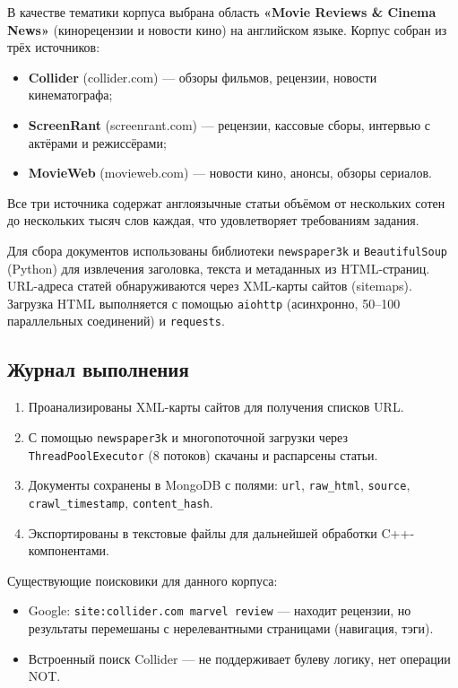 \documentclass[a4paper,12pt]{article}
\begin{document}
В качестве тематики корпуса выбрана область \textbf{«Movie Reviews \& Cinema News»} (кинорецензии и новости кино) на английском языке. Корпус собран из трёх источников:

\begin{itemize}
    \item \textbf{Collider} (collider.com) --- обзоры фильмов, рецензии, новости кинематографа;
    \item \textbf{ScreenRant} (screenrant.com) --- рецензии, кассовые сборы, интервью с актёрами и режиссёрами;
    \item \textbf{MovieWeb} (movieweb.com) --- новости кино, анонсы, обзоры сериалов.
\end{itemize}

Все три источника содержат англоязычные статьи объёмом от нескольких сотен до нескольких тысяч слов каждая, что удовлетворяет требованиям задания.

Для сбора документов использованы библиотеки \texttt{newspaper3k} и \texttt{BeautifulSoup} (Python) для извлечения заголовка, текста и метаданных из HTML-страниц. URL-адреса статей обнаруживаются через XML-карты сайтов (sitemaps). Загрузка HTML выполняется с помощью \texttt{aiohttp} (асинхронно, 50--100 параллельных соединений) и \texttt{requests}.

\subsection{Журнал выполнения}

\begin{enumerate}
    \item Проанализированы XML-карты сайтов для получения списков URL.
    \item С помощью \texttt{newspaper3k} и многопоточной загрузки через \texttt{ThreadPoolExecutor} (8 потоков) скачаны и распарсены статьи.
    \item Документы сохранены в MongoDB с полями: \texttt{url}, \texttt{raw\_html}, \texttt{source}, \texttt{crawl\_timestamp}, \texttt{content\_hash}.
    \item Экспортированы в текстовые файлы для дальнейшей обработки C++-компонентами.
\end{enumerate}

Существующие поисковики для данного корпуса:
\begin{itemize}
    \item Google: \texttt{site:collider.com marvel review} --- находит рецензии, но результаты перемешаны с нерелевантными страницами (навигация, тэги).
    \item Встроенный поиск Collider --- не поддерживает булеву логику, нет операции NOT.
\end{itemize}
\end{document}
